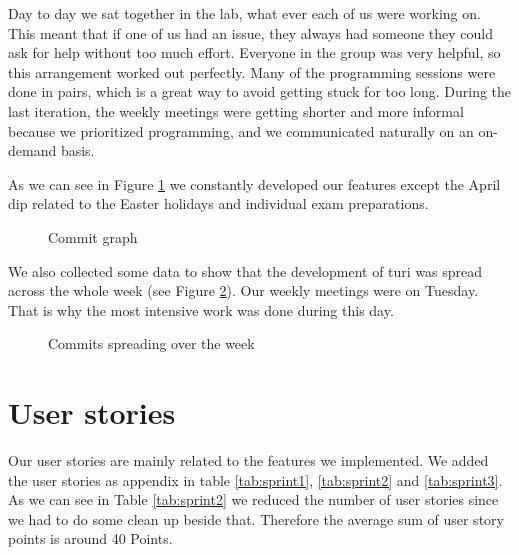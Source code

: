 \documentclass[a4paper]{article}
\begin{document}
\noindent
Day to day we sat together in the lab, what ever each of us were working on. This meant that if one of us had an issue, they always had someone they could ask for help without too much effort. Everyone in the group was very helpful, so this arrangement worked out perfectly. Many of the programming sessions were done in pairs, which is a great way to avoid getting stuck for too long. During the last iteration, the weekly meetings were getting shorter and more informal because we prioritized programming, and we communicated naturally on an on-demand basis.


\noindent
As we can see in Figure \ref{fig:commitgraph} we constantly developed our features except the April dip related to the Easter holidays and individual exam preparations.\\

\begin{figure}[!h]
  \begin{center}
    \caption{Commit graph}
    \label{fig:commitgraph}
  \end{center}
\end{figure}

We also collected some data to show that the development of turi was spread across the whole week (see Figure \ref{fig:commitfrequency}). Our weekly meetings were on Tuesday. That is why the most intensive work was done during this day. \\

\begin{figure}[!htb]
  \begin{center}
    \caption{Commits spreading over the week}
    \label{fig:commitfrequency}
  \end{center}
\end{figure}

\section{User stories}
Our user stories are mainly related to the features we implemented. We added the user stories as appendix in table \ref{tab:sprint1}, \ref{tab:sprint2} and \ref{tab:sprint3}. As we can see in Table \ref{tab:sprint2} we reduced the number of user stories since we had to do some clean up beside that. Therefore the average sum of user story points is around 40 Points.
\end{document}
